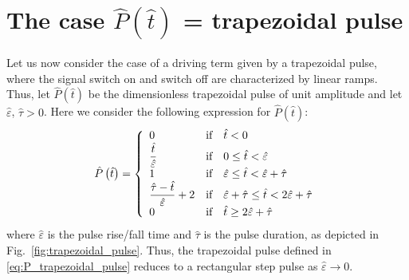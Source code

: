 \documentclass[12pt,a4paper]{amsart}
\theoremstyle{definition}
\newcommand{\hatt}{\hat{t}}
\begin{document}
\section{The case $\hat{P}(\hatt)$ = trapezoidal pulse}\label{sec:trapezoidal_pulse}

Let us now consider the case of a driving term given by a trapezoidal pulse, where the signal switch on and switch off are characterized by linear ramps. Thus,
let $\hat{P}\left( \hat{t}\right) $
be the dimensionless trapezoidal pulse of unit amplitude and let
$\hat{\varepsilon}$, $\hat{\tau}>0$. Here we consider the following expression for  $\hat{P}\left( \hat{t}\right) $:
\begin{equation}\label{eq:P_trapezoidal_pulse}
\hat{P}\left( \hat{t}\right) =\left\{
\begin{array}{lll}
0 & \text{if} & \hat{t}<0
\\
\dfrac{\hat{t}}{\hat{\varepsilon}} & \text{if} & 0\leq \hat{t}<\hat{%
\varepsilon} \\
1 & \text{if} & \hat{\varepsilon}\leq \hat{t}<\hat{\varepsilon}+\hat{\tau}
\\
\dfrac{\hat{\tau}-\hat{t}}{\hat{\varepsilon}}+2 & \text{if} & \hat{%
\varepsilon}+\hat{\tau}\leq \hat{t}<2\hat{\varepsilon}+\hat{\tau} \\
0 & \text{if} & \hat{t}\geq 2\hat{\varepsilon}+\hat{\tau}%
\end{array}%
\right.
\end{equation}%
where $\hat{\varepsilon}$ is the pulse rise/fall time and $\hat{\tau}$ is
the pulse duration, as depicted in Fig.~\ref{fig:trapezoidal_pulse}.  Thus, the trapezoidal pulse defined in \eqref {eq:P_trapezoidal_pulse} reduces to a rectangular step pulse
as $\hat{\varepsilon}\rightarrow 0$.
\end{document}
